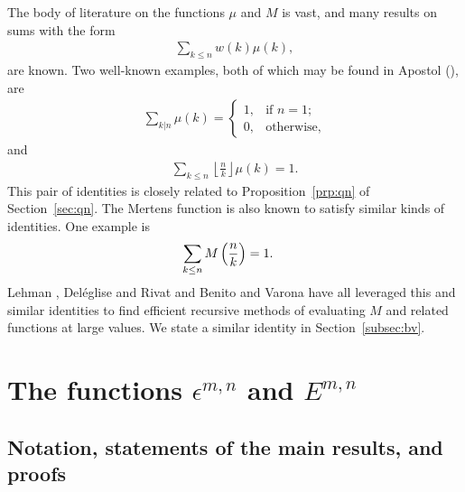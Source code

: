 \documentclass[12pt,reqno]{article}
\newcommand\floor[1]{\left\lfloor#1\right\rfloor}
\newcommand{\paren}[1]{\left\lparen{#1}\right\rparen}
\begin{document}
The body of literature on the functions $\mu$ and $M$ is vast, 
and many results on sums with the form 
\begin{align*}\sum_{k\leq n}w(k)\mu(k),\end{align*}
are known. Two well-known examples, both of which may be found in Apostol (\cite[Theorem 2.1 and Theorem 3.12]{apostol1998introduction}), are
\begin{align}
\sum_{k|n}\mu(k)=\begin{cases} 1, &\text{if $n=1$;}\\
0, & \text{otherwise,}
\end{cases}
\label{eqn:delta}
\end{align}
and 
\begin{align}
\sum_{k\leq n}\floor{\frac{n}{k}} \mu(k)=1.
\label{eqn:sumdelta}
\end{align}
This pair of identities is closely related to Proposition~\ref{prp:qn} of Section~\ref{sec:qn}.
The Mertens function is also known to satisfy similar kinds of identities. One example is
\begin{align*}
\sum_{k\leq n} M\paren{\frac{n}{k}} &= 1. 
\end{align*}
Lehman \cite{lehman1960liouville}, Del{\'e}glise and Rivat \cite{deleglise1996computing} and Benito and Varona  \cite{benito2008recursive} have all leveraged 
this and similar identities to find efficient recursive methods of evaluating $M$ and related functions at large values.
We state a similar identity in Section~\ref{subsec:bv}.

\section{The functions  \texorpdfstring{$\epsilon^{m,n}$}{epsilon {m,n}} and \texorpdfstring{$E^{m,n}$}{E {m,n}}}
\subsection{Notation, statements of the main results, and proofs}
\label{sec:main}
\end{document}
